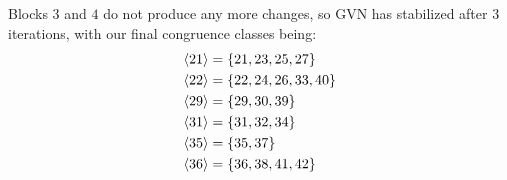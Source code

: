 Blocks $3$ and $4$ do not produce any more changes, so \gls{GVN} has stabilized
after $3$ iterations, with our final congruence classes being:
%
\begin{align*}
  \langle 21\rangle &= \{21, 23, 25, 27\}     \\
  \langle 22\rangle &= \{22, 24, 26, 33, 40\} \\
  \langle 29\rangle &= \{29, 30, 39\}         \\
  \langle 31\rangle &= \{31, 32, 34\}         \\
  \langle 35\rangle &= \{35, 37\}             \\
  \langle 36\rangle &= \{36, 38, 41, 42\}
\end{align*}

